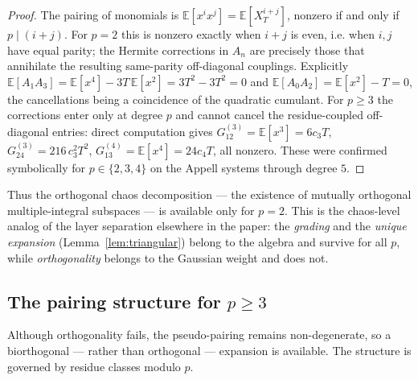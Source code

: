 \documentclass[11pt,reqno]{amsart}
\theoremstyle{plain}
\theoremstyle{definition}
\newcommand{\E}{\mathbb{E}}
\begin{document}
\begin{proof}
The pairing of monomials is $\E[x^i x^j] = \E[X_T^{i+j}]$, nonzero if and only if $p \mid (i+j)$. For $p=2$ this is nonzero exactly when $i+j$ is even, i.e. when $i,j$ have equal parity; the Hermite corrections in $A_n$ are precisely those that annihilate the resulting same-parity off-diagonal couplings. Explicitly $\E[A_1 A_3] = \E[x^4] - 3T\,\E[x^2] = 3T^2 - 3T^2 = 0$ and $\E[A_0 A_2] = \E[x^2] - T = 0$, the cancellations being a coincidence of the quadratic cumulant. For $p \geq 3$ the corrections enter only at degree $p$ and cannot cancel the residue-coupled off-diagonal entries: direct computation gives $G^{(3)}_{12} = \E[x^3] = 6c_3 T$, $G^{(3)}_{24} = 216\, c_3^2 T^2$, $G^{(4)}_{13} = \E[x^4] = 24 c_4 T$, all nonzero. These were confirmed symbolically for $p \in \{2,3,4\}$ on the Appell systems through degree $5$.
\end{proof}

Thus the orthogonal chaos decomposition --- the existence of mutually orthogonal multiple-integral subspaces --- is available only for $p=2$. This is the chaos-level analog of the layer separation elsewhere in the paper: the \emph{grading} and the \emph{unique expansion} (Lemma~\ref{lem:triangular}) belong to the algebra and survive for all $p$, while \emph{orthogonality} belongs to the Gaussian weight and does not.

\subsection{The pairing structure for \texorpdfstring{$p \geq 3$}{p>=3}}

Although orthogonality fails, the pseudo-pairing remains non-degenerate, so a biorthogonal --- rather than orthogonal --- expansion is available. The structure is governed by residue classes modulo $p$.
\end{document}
